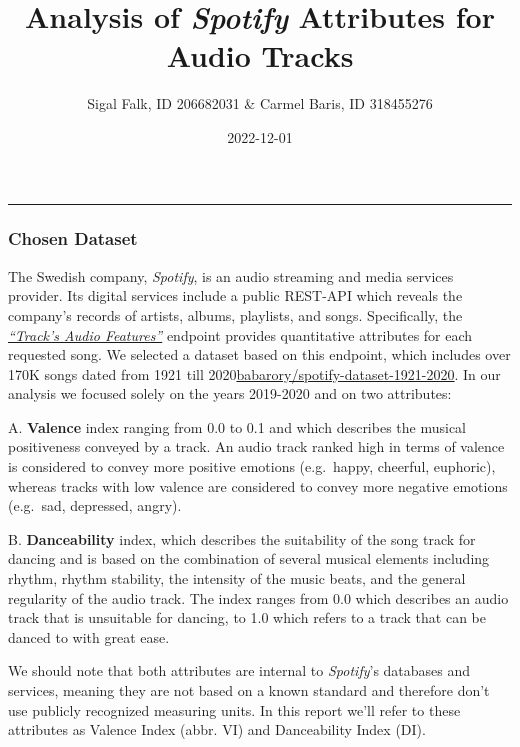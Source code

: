 \documentclass[
]{article}
\title{Analysis of \emph{Spotify} Attributes for Audio Tracks}
\author{Sigal Falk, ID 206682031 \& Carmel Baris, ID 318455276}
\date{2022-12-01}
\begin{document}
\maketitle

\begin{center}\rule{0.5\linewidth}{0.5pt}\end{center}

\hypertarget{chosen-dataset}{%
\subsubsection{Chosen Dataset}\label{chosen-dataset}}

The Swedish company, \emph{Spotify}, is an audio streaming and media
services provider. Its digital services include a public REST-API which
reveals the company's records of artists, albums, playlists, and songs.
Specifically, the
\href{https://developer.spotify.com/documentation/web-api/reference/\#/operations/get-several-audio-features}{\emph{``Track's
Audio Features''}} endpoint provides quantitative attributes for each
requested song. We selected a dataset based on this endpoint, which
includes over 170K songs dated from 1921 till
2020\href{https://data.world/babarory/spotify-dataset-1921-2020}{babarory/spotify-dataset-1921-2020}.
In our analysis we focused solely on the years 2019-2020 and on two
attributes:

A. \textbf{Valence} index ranging from 0.0 to 0.1 and which describes
the musical positiveness conveyed by a track. An audio track ranked high
in terms of valence is considered to convey more positive emotions
(e.g.~happy, cheerful, euphoric), whereas tracks with low valence are
considered to convey more negative emotions (e.g.~sad, depressed,
angry).

B. \textbf{Danceability} index, which describes the suitability of the
song track for dancing and is based on the combination of several
musical elements including rhythm, rhythm stability, the intensity of
the music beats, and the general regularity of the audio track. The
index ranges from 0.0 which describes an audio track that is unsuitable
for dancing, to 1.0 which refers to a track that can be danced to with
great ease.

We should note that both attributes are internal to \emph{Spotify}'s
databases and services, meaning they are not based on a known standard
and therefore don't use publicly recognized measuring units. In this
report we'll refer to these attributes as Valence Index (abbr. VI) and
Danceability Index (DI).
\end{document}
